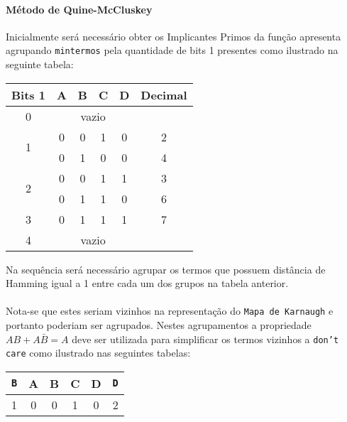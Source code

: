 \documentclass{article}
\begin{document}
\begin{resolution}
                \paragraph{Método de Quine-McCluskey}Inicialmente será necessário obter os Implicantes Primos da função apresenta agrupando \texttt{mintermos} pela quantidade de bits 1 presentes como ilustrado na seguinte tabela:
                    \begin{table}[H]
                        \centering\begin{tabular}{c cccc c}
                            Bits 1             & A & B & C & D             & Decimal\\\hline
                            0                  & \multicolumn{4}{c}{vazio} & \\\hline
                            \multirow{2}{*}{1} & 0 & 0 & 1 & 0             & 2\\
                                               & 0 & 1 & 0 & 0             & 4\\\hline
                            \multirow{2}{*}{2} & 0 & 0 & 1 & 1             & 3\\
                                               & 0 & 1 & 1 & 0             & 6\\\hline
                            3                  & 0 & 1 & 1 & 1             & 7\\\hline
                            4                  & \multicolumn{4}{c}{vazio} & \\\hline
                        \end{tabular}
                    \end{table}
                Na sequência será necessário agrupar os termos que possuem distância de Hamming igual a 1 entre cada um dos grupos na tabela anterior.
                \\\\
                Nota-se que estes seriam vizinhos na representação do \texttt{Mapa de Karnaugh} e portanto poderiam ser agrupados. Nestes agrupamentos a propriedade $AB + A\bar{B} = A$ deve ser utilizada para simplificar os termos vizinhos a \texttt{don't care} como ilustrado nas seguintes tabelas:
                    \begin{table}[H]
                        \centering\begin{tabular}{c cccc c}
                            \texttt{B}         & A & B & C & D & \texttt{D}\\\hline
                            \multirow{2}{*}{1} & 0 & 0 & 1 & 0 & 2\\

\end{tabular}
\end{table}
\end{resolution}
\end{document}
